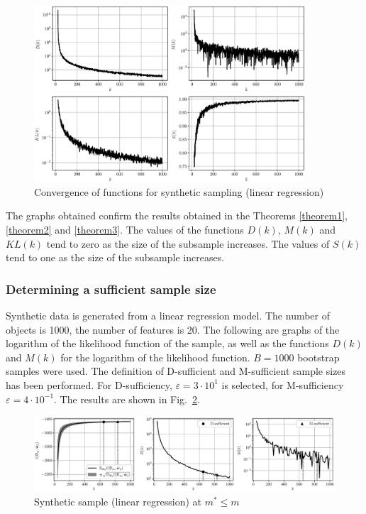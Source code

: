 \documentclass[
11pt,%
tightenlines,%
twoside,%
onecolumn,%
nofloats,%
nobibnotes,%
nofootinbib,%
superscriptaddress,%
noshowpacs,%
centertags]%
{revtex4-2}
\begin{document}
\begin{figure}[h!]
    \centering
    \includegraphics[width=0.9\textwidth]{../paper/figures/gray/eps/synthetic-regression-functions}
    \caption{Convergence of functions for synthetic sampling (linear regression)}
    \label{synthetic-regression-functions}
\end{figure}

The graphs obtained confirm the results obtained in the Theorems \ref{theorem1}, \ref{theorem2} and \ref{theorem3}. The values of the functions $D(k)$, $M(k)$ and $KL(k)$ tend to zero as the size of the subsample increases. The values of $S(k)$ tend to one as the size of the subsample increases.

\subsubsection{Determining a sufficient sample size}

Synthetic data is generated from a linear regression model. The number of objects is 1000, the number of features is 20. The following are graphs of the logarithm of the likelihood function of the sample, as well as the functions $D(k)$ and $M(k)$ for the logarithm of the likelihood function. $B=1000$ bootstrap samples were used. The definition of D-sufficient and M-sufficient sample sizes has been performed. For D-sufficiency, $\varepsilon = 3 \cdot 10^{1}$ is selected, for M-sufficiency $\varepsilon = 4 \cdot 10^{-1}$. The results are shown in Fig.~\ref{synthetic-regression-sufficient}. 

\begin{figure}[h!]
    \centering
    \includegraphics[width=\textwidth]{../paper/figures/gray/eps/synthetic-regression-sufficient}
    \caption{Synthetic sample (linear regression) at $m^*\leqslant m$}
    \label{synthetic-regression-sufficient}
\end{figure}
\end{document}
